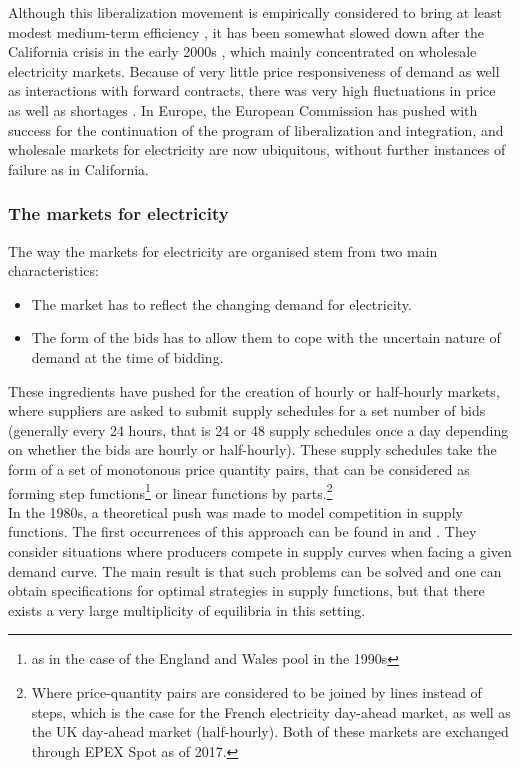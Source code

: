 Although this liberalization movement is empirically considered to bring at least modest medium-term efficiency \cite{fabrizio2007markets}, it has been somewhat slowed down after the California crisis in the early 2000s \cite{jamasb2005electricity}, which mainly concentrated on wholesale electricity markets. Because of very little price responsiveness of demand as well as interactions with forward contracts, there was very high fluctuations in price as well as shortages \cite{borenstein2002trouble}. In Europe, the European Commission has pushed with success for the continuation of the program of liberalization and integration, and wholesale markets for electricity are now ubiquitous, without further instances of failure as in California. 

\subsubsection*{The markets for electricity}
The way the markets for electricity are organised stem from two main characteristics:
\begin{itemize}
\item The market has to reflect the changing demand for electricity.
\item The form of the bids has to allow them to cope with the uncertain nature of demand at the time of bidding.
\end{itemize}

These ingredients have pushed for the creation of hourly or half-hourly markets, where suppliers are asked to submit supply schedules for a set number of bids (generally every 24 hours, that is 24 or 48 supply schedules once a day depending on whether the bids are hourly or half-hourly). These supply schedules take the form of a set of monotonous price quantity pairs, that can be considered as forming step functions\footnote{as in the case of the England and Wales pool in the 1990s} or linear functions by parts.\footnote{Where price-quantity pairs are considered to be joined by lines instead of steps, which is the case for the French electricity day-ahead market, as well as the UK day-ahead market (half-hourly). Both of these markets are exchanged through EPEX Spot as of 2017.}\\

In the 1980s, a theoretical push was made to model competition in supply functions. The first occurrences of this approach can be found in \cite{grossman1981nash} and \cite{hart1982imperfect}. They consider situations where producers compete in supply curves when facing a given demand curve. The main result is that such problems can be solved and one can obtain specifications for optimal strategies in supply functions, but that there exists a very large multiplicity of equilibria in this setting.\\

